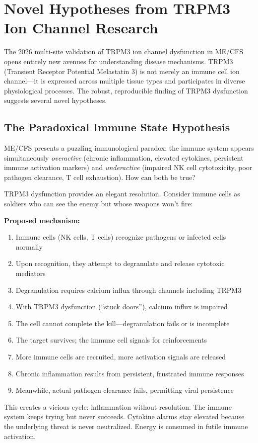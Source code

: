 \section{Novel Hypotheses from TRPM3 Ion Channel Research}
\label{sec:trpm3-hypotheses}

The 2026 multi-site validation of TRPM3 ion channel dysfunction in ME/CFS~\cite{Sasso2026trpm3} opens entirely new avenues for understanding disease mechanisms. TRPM3 (Transient Receptor Potential Melastatin 3) is not merely an immune cell ion channel---it is expressed across multiple tissue types and participates in diverse physiological processes. The robust, reproducible finding of TRPM3 dysfunction suggests several novel hypotheses.

\subsection{The Paradoxical Immune State Hypothesis}

\begin{open_question}
ME/CFS presents a puzzling immunological paradox: the immune system appears simultaneously \textit{overactive} (chronic inflammation, elevated cytokines, persistent immune activation markers) and \textit{underactive} (impaired NK cell cytotoxicity, poor pathogen clearance, T cell exhaustion). How can both be true?

TRPM3 dysfunction provides an elegant resolution. Consider immune cells as soldiers who can see the enemy but whose weapons won't fire:

\textbf{Proposed mechanism:}
\begin{enumerate}
    \item Immune cells (NK cells, T cells) recognize pathogens or infected cells normally
    \item Upon recognition, they attempt to degranulate and release cytotoxic mediators
    \item Degranulation requires calcium influx through channels including TRPM3
    \item With TRPM3 dysfunction (``stuck doors''), calcium influx is impaired
    \item The cell cannot complete the kill---degranulation fails or is incomplete
    \item The target survives; the immune cell signals for reinforcements
    \item More immune cells are recruited, more activation signals are released
    \item Chronic inflammation results from persistent, frustrated immune responses
    \item Meanwhile, actual pathogen clearance fails, permitting viral persistence
\end{enumerate}

This creates a vicious cycle: inflammation without resolution. The immune system keeps trying but never succeeds. Cytokine alarms stay elevated because the underlying threat is never neutralized. Energy is consumed in futile immune activation.
\end{open_question}

